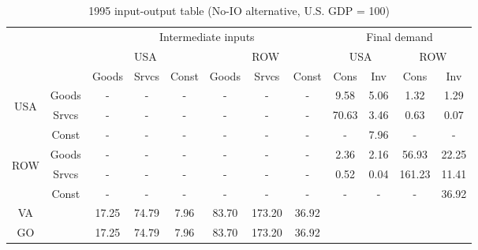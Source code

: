 \begin{table}[p]
\footnotesize
\begin{center}
\caption{1995 input-output table (No-IO alternative, U.S. GDP = 100)}
\label{tab:iomat_noio_2c}
\begin{tabular}{cccccccccccc}
\toprule
& & \multicolumn{6}{c}{Intermediate inputs}&\multicolumn{4}{c}{Final demand}\\
\cmidrule(rl){3-8}\cmidrule(rl){9-12}&& \multicolumn{3}{c}{USA}& \multicolumn{3}{c}{ROW}& \multicolumn{2}{c}{USA}& \multicolumn{2}{c}{ROW}\\
\cmidrule(rl){3-5}\cmidrule(rl){6-8}\cmidrule(rl){9-10}\cmidrule(rl){11-12}
&&Goods&Srvcs&Const&Goods&Srvcs&Const& Cons & Inv& Cons & Inv\\
\midrule
\multirow{3}{*}{\begin{sideways}USA\end{sideways}}&Goods&-&-&-&-&-&-&9.58&5.06&1.32&1.29\\
&Srvcs&-&-&-&-&-&-&70.63&3.46&0.63&0.07\\
&Const&-&-&-&-&-&-&-&7.96&-&-\\
\multirow{3}{*}{\begin{sideways}ROW\end{sideways}}&Goods&-&-&-&-&-&-&2.36&2.16&56.93&22.25\\
&Srvcs&-&-&-&-&-&-&0.52&0.04&161.23&11.41\\
&Const&-&-&-&-&-&-&-&-&-&36.92\\
\midrule
VA &&17.25&74.79&7.96&83.70&173.20&36.92\\
\midrule
GO &&17.25&74.79&7.96&83.70&173.20&36.92\\
\bottomrule
\end{tabular}
\end{center}
\normalsize
\end{table}
